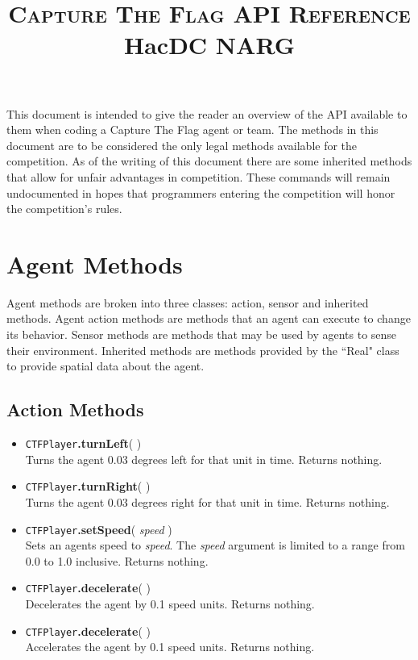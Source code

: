 \documentclass{article}
\begin{document}
\title{\LARGE{\textsc{Capture The Flag API Reference}}\\\large{HacDC NARG}}
\maketitle
This document is intended to give the reader an overview of the API available to them when coding a Capture The Flag agent or team. The methods in this document are to be considered the only legal methods available for the competition. As of the writing of this document there are some inherited methods that allow for unfair advantages in competition. These commands will remain undocumented in hopes that programmers entering the competition will honor the competition's rules. 
\section*{Agent Methods}
Agent methods are broken into three classes: action, sensor and inherited methods. Agent action methods are methods that an agent can execute to change its behavior. Sensor methods are methods that may be used by agents to sense their environment. Inherited methods are methods provided by the ``Real" class to provide spatial data about the agent.
\subsection*{Action Methods}
	\begin{itemize}
		\item\verb|CTFPlayer|\textbf{.turnLeft}( )\\
		Turns the agent 0.03 degrees left for that unit in time. Returns nothing.
		\item\verb|CTFPlayer|\textbf{.turnRight}( )\\
		Turns the agent 0.03 degrees right for that unit in time. Returns nothing.
		\item\verb|CTFPlayer|\textbf{.setSpeed}( \emph{speed} )\\
		Sets an agents speed to \emph{speed}. The \emph{speed} argument is limited to a range from 0.0 to 1.0 inclusive. Returns nothing.
		\item\verb|CTFPlayer|\textbf{.decelerate}(  )\\
		Decelerates the agent by 0.1 speed units. Returns nothing.
		\item\verb|CTFPlayer|\textbf{.decelerate}(  )\\
		Accelerates the agent by 0.1 speed units. Returns nothing.		
	\end{itemize}
\end{document}
